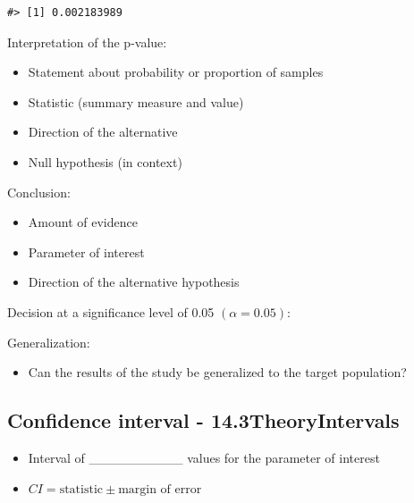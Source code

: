 \documentclass[
]{report}
\providecommand{\tightlist}{%
  \setlength{\itemsep}{0pt}\setlength{\parskip}{0pt}}
\begin{document}
\begin{verbatim}
#> [1] 0.002183989
\end{verbatim}

Interpretation of the p-value:

\begin{itemize}
\item
  Statement about probability or proportion of samples
\item
  Statistic (summary measure and value)
\item
  Direction of the alternative
\item
  Null hypothesis (in context)
\end{itemize}

\vspace{0.6in}

Conclusion:

\begin{itemize}
\item
  Amount of evidence
\item
  Parameter of interest
\item
  Direction of the alternative hypothesis
\end{itemize}

\vspace{0.5in}

Decision at a significance level of 0.05 \((\alpha = 0.05)\):

\vspace{0.3in}

Generalization:

\begin{itemize}
\tightlist
\item
  Can the results of the study be generalized to the target population?
\end{itemize}

\vspace{0.4in}

\subsection*{Confidence interval - 14.3TheoryIntervals}\label{confidence-interval---14.3theoryintervals}

\begin{itemize}
\item
  Interval of \_\_\_\_\_\_\_\_\_\_ values for the parameter of interest
\item
  \(CI = \text{statistic} \pm \text{margin of error}\)
\end{itemize}
\end{document}

